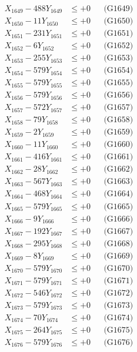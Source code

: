 \documentclass[a4paper,10pt]{article}
\begin{document}
{\begin{align}
X_{1649} - 488Y_{1649} &\leq +0 && \text{(G1649)} \\
X_{1650} - 11Y_{1650} &\leq +0 && \text{(G1650)} \\
\allowbreak
X_{1651} - 231Y_{1651} &\leq +0 && \text{(G1651)} \\
X_{1652} - 6Y_{1652} &\leq +0 && \text{(G1652)} \\
X_{1653} - 255Y_{1653} &\leq +0 && \text{(G1653)} \\
X_{1654} - 579Y_{1654} &\leq +0 && \text{(G1654)} \\
X_{1655} - 579Y_{1655} &\leq +0 && \text{(G1655)} \\
X_{1656} - 579Y_{1656} &\leq +0 && \text{(G1656)} \\
X_{1657} - 572Y_{1657} &\leq +0 && \text{(G1657)} \\
X_{1658} - 79Y_{1658} &\leq +0 && \text{(G1658)} \\
X_{1659} - 2Y_{1659} &\leq +0 && \text{(G1659)} \\
X_{1660} - 11Y_{1660} &\leq +0 && \text{(G1660)} \\
\allowbreak
X_{1661} - 416Y_{1661} &\leq +0 && \text{(G1661)} \\
X_{1662} - 28Y_{1662} &\leq +0 && \text{(G1662)} \\
X_{1663} - 567Y_{1663} &\leq +0 && \text{(G1663)} \\
X_{1664} - 468Y_{1664} &\leq +0 && \text{(G1664)} \\
X_{1665} - 579Y_{1665} &\leq +0 && \text{(G1665)} \\
X_{1666} - 9Y_{1666} &\leq +0 && \text{(G1666)} \\
X_{1667} - 192Y_{1667} &\leq +0 && \text{(G1667)} \\
X_{1668} - 295Y_{1668} &\leq +0 && \text{(G1668)} \\
X_{1669} - 8Y_{1669} &\leq +0 && \text{(G1669)} \\
X_{1670} - 579Y_{1670} &\leq +0 && \text{(G1670)} \\
\allowbreak
X_{1671} - 579Y_{1671} &\leq +0 && \text{(G1671)} \\
X_{1672} - 546Y_{1672} &\leq +0 && \text{(G1672)} \\
X_{1673} - 579Y_{1673} &\leq +0 && \text{(G1673)} \\
X_{1674} - 70Y_{1674} &\leq +0 && \text{(G1674)} \\
X_{1675} - 264Y_{1675} &\leq +0 && \text{(G1675)} \\
X_{1676} - 579Y_{1676} &\leq +0 && \text{(G1676)} \\

\end{align}}
\end{document}
